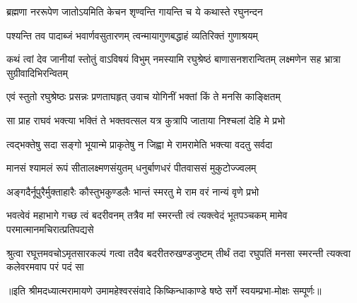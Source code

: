 \twolineshloka
{ब्रह्मणा नररूपेण जातोऽयमिति केचन}
{शृण्वन्ति गायन्ति च ये कथास्ते रघुनन्दन} %

\twolineshloka
{पश्यन्ति तव पादाब्जं भवार्णवसुतारणम्}
{त्वन्मायागुणबद्धाहं व्यतिरिक्तं गुणाश्रयम्} %

\threelineshloka
{कथं त्वां देव जानीयां स्तोतुं वाऽविषयं विभुम्}
{नमस्यामि रघुश्रेष्ठं बाणासनशरान्वितम्}
{लक्ष्मणेन सह भ्रात्रा सुग्रीवादिभिरन्वितम्} %

\twolineshloka
{एवं स्तुतो रघुश्रेष्ठः प्रसन्नः प्रणताघहृत्}
{उवाच योगिनीं भक्तां किं ते मनसि काङ्क्षितम्} %

\twolineshloka
{सा प्राह राघवं भक्त्या भक्तिं ते भक्तवत्सल}
{यत्र कुत्रापि जाताया निश्चलां देहि मे प्रभो} %

\twolineshloka
{त्वद्भक्तेषु सदा सङ्गो भूयान्मे प्राकृतेषु न}
{जिह्वा मे रामरामेति भक्त्या वदतु सर्वदा} %

\twolineshloka
{मानसं श्यामलं रूपं सीतालक्ष्मणसंयुतम्}
{धनुर्बाणधरं पीतवाससं मुकुटोज्ज्वलम्} %

\twolineshloka
{अङ्गदैर्नूपुरैर्मुक्ताहारैः कौस्तुभकुण्डलैः}
{भान्तं स्मरतु मे राम वरं नान्यं वृणे प्रभो} %


\threelineshloka
{भवत्वेवं महाभागे गच्छ त्वं बदरीवनम्}
{तत्रैव मां स्मरन्ती त्वं त्यक्त्वेदं भूतपञ्चकम्}
{मामेव परमात्मानमचिरात्प्रतिपद्यसे} %

\fourlineindentedshloka
{श्रुत्वा रघूत्तमवचोऽमृतसारकल्पं}
{गत्वा तदैव बदरीतरुखण्डजुष्टम्}
{तीर्थं तदा रघुपतिं मनसा स्मरन्ती}
{त्यक्त्वा कलेवरमवाप परं पदं सा} %

{॥इति श्रीमदध्यात्मरामायणे उमामहेश्वरसंवादे किष्किन्धाकाण्डे
षष्ठे सर्गे स्वयम्प्रभा-मोक्षः सम्पूर्णः॥}
